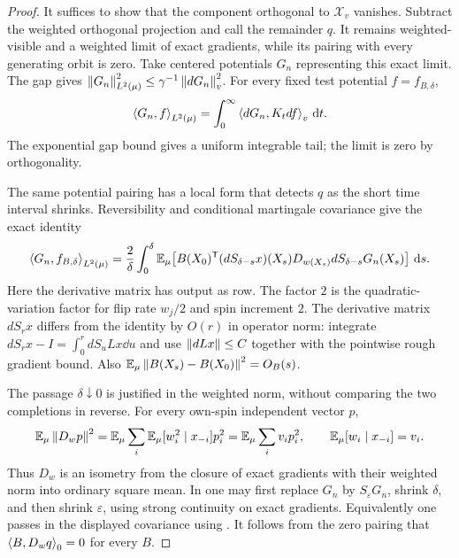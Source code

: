 \begin{proof}
It suffices to show that the component orthogonal to $\mathcal X_v$
vanishes.  Subtract the weighted orthogonal projection and call the
remainder $q$.  It remains weighted-visible and a weighted limit of exact
gradients, while its pairing with every generating orbit is zero.  Take centered potentials $G_n$
representing this exact limit.  The gap gives
$\left\lVert G_n\right\rVert_{L^2(\mu)}^2\le\gamma^{-1}\left\lVert dG_n\right\rVert_v^2$.
For every fixed test potential $f=f_{B,\delta}$,
\begin{equation}\label{eq:exact-potential-pairing}
 \left\langle G_n,f\right\rangle_{L^2(\mu)}
 =\int_0^\infty\left\langle dG_n,K_tdf\right\rangle_v\,\mathrm d t.
\end{equation}
The exponential gap bound gives a uniform integrable tail; the limit is
zero by orthogonality.

The same potential pairing has a local form that detects $q$ as the
short time interval shrinks.  Reversibility and conditional martingale
covariance give the exact identity
\begin{align}\label{eq:exact-covariance-potential}
 \left\langle G_n,f_{B,\delta}\right\rangle_{L^2(\mu)}
 =\frac2\delta\int_0^\delta
 \mathbb E_\mu\!\left[
 B(X_0)^{\mathsf T}(dS_{\delta-s}x)(X_s)
 D_{w(X_s)}dS_{\delta-s}G_n(X_s)\right]\,\mathrm d s.
\end{align}
Here the derivative matrix has output as row.  The factor $2$ is the
quadratic-variation factor for flip rate $w_j/2$ and spin increment $2$.
The derivative matrix $dS_rx$ differs from the identity by $O(r)$ in
operator norm: integrate $dS_rx-I=\int_0^r dS_uLx\dd u$ and use
$\left\lVert dLx\right\rVert\le C$ together with the pointwise rough gradient bound.
Also $\mathbb E_\mu\left\lVert B(X_s)-B(X_0)\right\rVert^2=O_B(s)$.

The passage $\delta\downarrow0$ is justified in the weighted norm,
without comparing the two completions in reverse.  For every own-spin
independent vector $p$,
\begin{equation}\label{eq:exact-w-isometry}
 \mathbb E_\mu\left\lVert D_wp\right\rVert^2
 =\mathbb E_\mu\sum_i\mathbb E_\mu[w_i^2\mid x_{-i}]p_i^2
 =\mathbb E_\mu\sum_i v_ip_i^2,
 \qquad
 \mathbb E_\mu[w_i\mid x_{-i}]=v_i.
\end{equation}
Thus $D_w$ is an isometry from the closure of exact gradients with their
weighted norm into ordinary square mean.  In 
one may first replace $G_n$ by $S_\varepsilon G_n$, shrink $\delta$, and
then shrink $\varepsilon$, using strong continuity on exact gradients.
Equivalently one passes in the displayed covariance using
.  It follows from the zero pairing that
$\left\langle B,D_wq\right\rangle_0=0$ for every $B$.


\end{proof}
